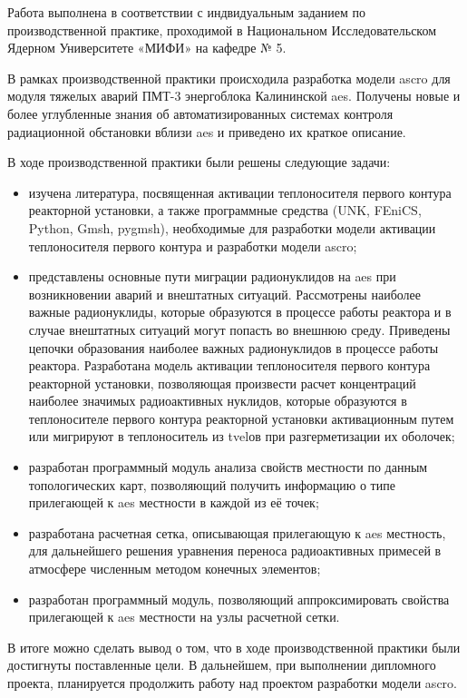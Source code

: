 
Работа выполнена в соответствии с индвидуальным заданием по производственной практике, проходимой в Национальном 
Исследовательском Ядерном Университете «МИФИ» на кафедре № 5.

В рамках производственной практики происходила разработка модели \ac{ascro} для модуля тяжелых аварий ПМТ-3 энергоблока 
Калининской \ac{aes}. Получены новые и более углубленные знания об автоматизированных системах контроля радиационной 
обстановки вблизи \ac{aes} и приведено их краткое описание.

В ходе производственной практики были решены следующие задачи:
\begin{itemize}
	\item изучена литература, посвященная активации теплоносителя первого контура реакторной установки, а также 
	программные средства (UNK, FEniCS, Python, Gmsh, pygmsh), необходимые для разработки модели активации теплоносителя 
	первого контура и разработки модели \ac{ascro};
	\item представлены основные пути миграции радионуклидов на \ac{aes} при возникновении аварий и внештатных ситуаций. 
	Рассмотрены наиболее важные радионуклиды, которые образуются в процессе работы реактора и в случае внештатных 
	ситуаций могут попасть во внешнюю среду. Приведены цепочки образования наиболее важных радионуклидов в процессе 
	работы реактора. Разработана модель активации теплоносителя первого контура реакторной установки, позволяющая 
	произвести расчет концентраций наиболее значимых радиоактивных нуклидов, которые образуются в теплоносителе первого 
	контура реакторной установки активационным путем или мигрируют в теплоноситель из \ac{tvel}ов при разгерметизации 
	их оболочек;
	\item разработан программный модуль анализа свойств местности по данным топологических карт, позволяющий получить 
	информацию о типе прилегающей к \ac{aes} местности в каждой из её точек;
	\item разработана расчетная сетка, описывающая прилегающую к \ac{aes} местность, для дальнейшего решения уравнения 
	переноса радиоактивных примесей в атмосфере численным методом конечных элементов;
	\item разработан программный модуль, позволяющий аппроксимировать свойства прилегающей к \ac{aes} местности на узлы 
	расчетной сетки. 
\end{itemize}

В итоге можно сделать вывод о том, что в ходе производственной практики были достигнуты поставленные цели. В дальнейшем,
при выполнении дипломного проекта, планируется продолжить работу над проектом разработки модели \ac{ascro}.   